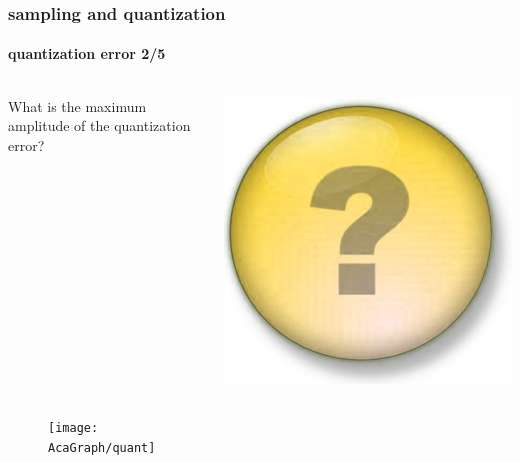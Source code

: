 	\begin{frame}\frametitle{sampling and quantization}\framesubtitle{quantization error 2/5}
		\vspace{-10mm}
		\begin{columns}
			\column{5cm}
			What is the maximum amplitude of the quantization error?
			
			\column{4cm}
			\begin{flushright}
				 \includegraphics[scale=.08]{Graph/question-mark}
			\end{flushright}
		\end{columns}
		
		\pause
		\vspace{-3mm}
		\begin{figure}
			\centering
				\texttt{[image: \\AcaGraph/quant]}
		\end{figure}
	\end{frame}		
